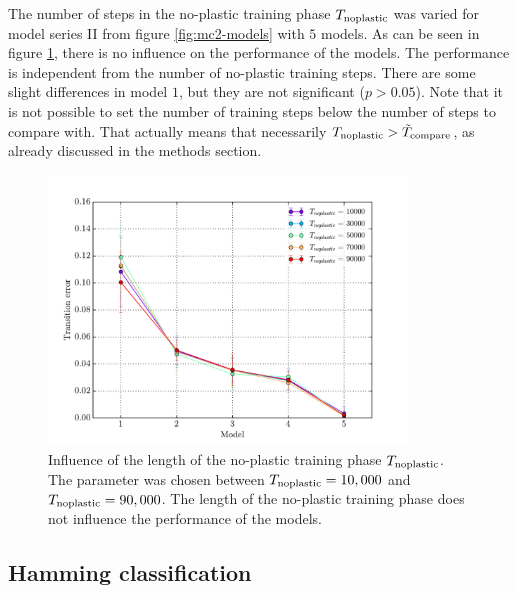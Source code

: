 The number of steps in the no-plastic training phase $T_{\text{noplastic}}$ was varied for model series II from figure \ref{fig:mc2-models} with $5$ models. As can be seen in figure \ref{fig:noplastic}, there is no influence on the performance of the models. The performance is independent from the number of no-plastic training steps. There are some slight differences in model $1$, but they are not significant ($p > 0.05$). Note that it is not possible to set the number of training steps below the number of steps to compare with. That actually means that necessarily $T_{\text{noplastic}} > \tilde{T}_{\text{compare}}$, as already discussed in the methods section.

\begin{figure}[!b]
	\centering
	\includegraphics[width=0.85\textwidth]{appendix/noplastic_train}
	\caption[Influence of the length of the no-plastic training phase]{Influence of the length of the no-plastic training phase $T_{\text{noplastic}}$. The parameter was chosen between $T_{\text{noplastic}} = 10,000$ and $T_{\text{noplastic}} = 90,000$. The length of the no-plastic training phase does not influence the performance of the models.}
	\label{fig:noplastic}
\end{figure}

\clearpage

\subsection{Hamming classification}
\label{sec:appendix:hamming}


